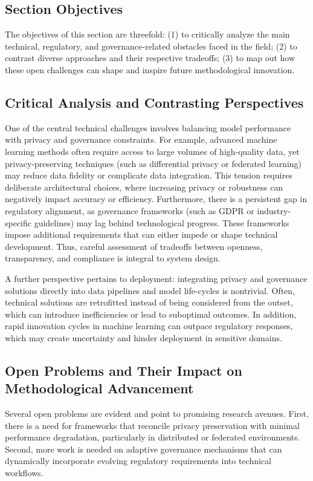 \documentclass[sigconf]{acmart}
\begin{document}
\subsection{Section Objectives}

The objectives of this section are threefold: (1) to critically analyze the main technical, regulatory, and governance-related obstacles faced in the field; (2) to contrast diverse approaches and their respective tradeoffs; (3) to map out how these open challenges can shape and inspire future methodological innovation.

\subsection{Critical Analysis and Contrasting Perspectives}

One of the central technical challenges involves balancing model performance with privacy and governance constraints. For example, advanced machine learning methods often require access to large volumes of high-quality data, yet privacy-preserving techniques (such as differential privacy or federated learning) may reduce data fidelity or complicate data integration. This tension requires deliberate architectural choices, where increasing privacy or robustness can negatively impact accuracy or efficiency. Furthermore, there is a persistent gap in regulatory alignment, as governance frameworks (such as GDPR or industry-specific guidelines) may lag behind technological progress. These frameworks impose additional requirements that can either impede or shape technical development. Thus, careful assessment of tradeoffs between openness, transparency, and compliance is integral to system design.

A further perspective pertains to deployment: integrating privacy and governance solutions directly into data pipelines and model life-cycles is nontrivial. Often, technical solutions are retrofitted instead of being considered from the outset, which can introduce inefficiencies or lead to suboptimal outcomes. In addition, rapid innovation cycles in machine learning can outpace regulatory responses, which may create uncertainty and hinder deployment in sensitive domains.

\subsection{Open Problems and Their Impact on Methodological Advancement}

Several open problems are evident and point to promising research avenues. First, there is a need for frameworks that reconcile privacy preservation with minimal performance degradation, particularly in distributed or federated environments. Second, more work is needed on adaptive governance mechanisms that can dynamically incorporate evolving regulatory requirements into technical workflows.
\end{document}

